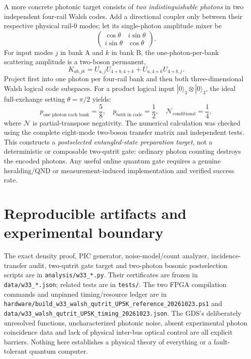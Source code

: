 \documentclass[10pt]{article}
\begin{document}
A more concrete photonic target consists of
\emph{two indistinguishable photons} in two
independent four-rail Walsh codes. Add a
directional coupler only between their
respective physical rail-0 modes; let its
single-photon amplitude mixer be
\[
\begin{pmatrix} \cos\theta&i\sin\theta\\
i\sin\theta&\cos\theta\end{pmatrix}.
\]
For input modes $j$ in bank A and $k$ in bank B,
the one-photon-per-bank scattering amplitude is
a two-boson permanent,
\[
K_{ab,jk}=U_{a,j}U_{4+b,4+k}
         +U_{a,4+k}U_{4+b,j}.
\]
Project first into one photon per four-rail bank
and then both three-dimensional Walsh
logical code subspaces. For a product
logical input $|0\rangle_3\otimes|0\rangle_3$,
the ideal full-exchange setting
$\theta=\pi/2$ yields:
\[
p_{\text{one photon each bank}}=\frac58,\quad
p_{\text{both in code}}=\frac12,\quad
\mathcal N_{\text{conditional}}=\frac14,
\]
where $\mathcal N$ is partial-transpose negativity.
The numerical calculation was checked using
the complete eight-mode two-boson transfer matrix
and independent tests. This constructs a
\emph{postselected entangled-state preparation
target}, not a deterministic or composable
two-qutrit gate: ordinary photon counting
destroys the encoded photons. Any useful
online quantum gate requires a genuine
heralding/QND or measurement-induced
implementation and verified success rate.

\section{Reproducible artifacts and experimental boundary}
The exact density proof, PIC generator,
noise-model/count analyzer, incidence-transfer
audit, two-qutrit gate target and two-photon
bosonic postselection scripts are in
\texttt{analysis/w33\_*.py}. Their certificates
are frozen in \texttt{data/w33\_*.json};
related tests are in \texttt{tests/}.
The two FPGA compilation commands and
unpinned timing/resource ledger are in
\texttt{hardware/build\_w33\_walsh\_qutrit\_UP5K\_reference\_20261023.ps1}
and
\texttt{data/w33\_walsh\_qutrit\_UP5K\_timing\_20261023.json}.
The GDS's deliberately unresolved functions,
uncharacterized photonic noise, absent
experimental photon coincidence data and
lack of physical inter-bus optical control
are all explicit barriers. Nothing here
establishes a physical theory of everything
or a fault-tolerant quantum computer.
\end{document}
